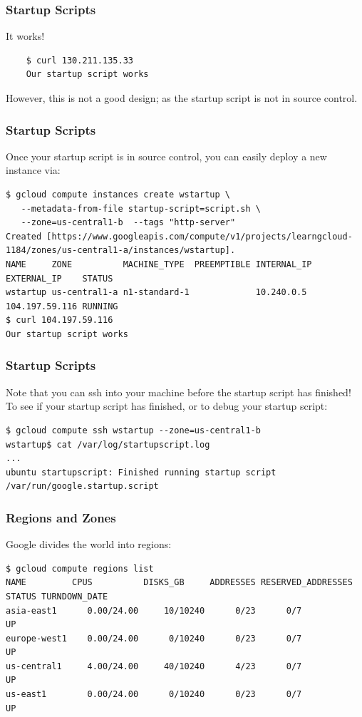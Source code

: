 \documentclass[9pt]{beamer}
\begin{document}
\begin{frame}[fragile]
	\frametitle{Startup Scripts}
	It works!
	\begin{verbatim}
	$ curl 130.211.135.33
	Our startup script works
	\end{verbatim}
	However, this is not a good design; as the startup script is not in source control.
\end{frame}

\begin{frame}[fragile]
\frametitle{Startup Scripts}
Once your startup script is in source control, you can easily deploy a new instance via:
\begin{verbatim}
$ gcloud compute instances create wstartup \
   --metadata-from-file startup-script=script.sh \
   --zone=us-central1-b  --tags "http-server"
Created [https://www.googleapis.com/compute/v1/projects/learngcloud-1184/zones/us-central1-a/instances/wstartup].
NAME     ZONE          MACHINE_TYPE  PREEMPTIBLE INTERNAL_IP EXTERNAL_IP    STATUS
wstartup us-central1-a n1-standard-1             10.240.0.5  104.197.59.116 RUNNING
$ curl 104.197.59.116
Our startup script works
\end{verbatim}
\end{frame}

\begin{frame}[fragile]
\frametitle{Startup Scripts}
Note that you can ssh into your machine before the startup script has finished! To see if your startup script has finished, or to debug your startup script:
\begin{verbatim}
$ gcloud compute ssh wstartup --zone=us-central1-b
wstartup$ cat /var/log/startupscript.log
...
ubuntu startupscript: Finished running startup script /var/run/google.startup.script
\end{verbatim}
\end{frame}

\begin{frame}[fragile]
\frametitle{Regions and Zones}
Google divides the world into regions:
\begin{verbatim}
$ gcloud compute regions list
NAME         CPUS          DISKS_GB     ADDRESSES RESERVED_ADDRESSES STATUS TURNDOWN_DATE
asia-east1      0.00/24.00     10/10240      0/23      0/7           UP
europe-west1    0.00/24.00      0/10240      0/23      0/7           UP
us-central1     4.00/24.00     40/10240      4/23      0/7           UP
us-east1        0.00/24.00      0/10240      0/23      0/7           UP
\end{verbatim}
\end{frame}
\end{document}
